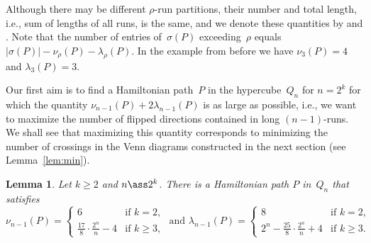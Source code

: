 \documentclass[a4paper,11pt,reqno]{amsart}
\newtheorem{lemma}[theorem]{Lemma}
\begin{document}
Although there may be different $\rho$-run partitions, their number and total length, i.e., sum of lengths of all runs, is the same, and we denote these quantities by  and .
Note that the number of entries of~$\sigma(P)$ exceeding~$\rho$ equals $|\sigma(P)|-\nu_\rho(P)-\lambda_\rho(P)$.
In the example from before we have $\nu_3(P)=4$ and $\lambda_3(P)=3$.

Our first aim is to find a Hamiltonian path~$P$ in the hypercube~$Q_n$ for $n=2^k$ for which the quantity $\nu_{n-1}(P)+2\lambda_{n-1}(P)$ is as large as possible, i.e., we want to maximize the number of flipped directions contained in long $(n-1)$-runs.
We shall see that maximizing this quantity corresponds to minimizing the number of crossings in the Venn diagrams constructed in the next section (see Lemma~\ref{lem:min}).

\begin{lemma}
\label{lem:run}
Let $k\geq 2$ and $n\ass 2^k$.
There is a Hamiltonian path $P$ in~$Q_n$ that satisfies
\[ \nu_{n-1}(P)=\begin{cases}
               6& \text{if } k=2, \\
               \frac{17}{8}\cdot\frac{2^n}{n}-4 & \text{if } k\ge 3,
               \end{cases} \text{   and   }
\lambda_{n-1}(P)=\begin{cases}
                 8 & \text{if } k=2, \\
                 2^n-\frac{25}{8}\cdot \frac{2^n}{n}+4 & \text{if } k\ge 3.
                 \end{cases} \]
\end{lemma}
\end{document}
